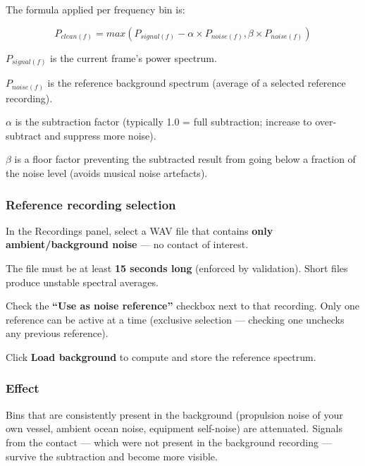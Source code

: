 The formula applied per frequency bin is:

\[
P_{clean(f)} = max( P_{signal(f)} - \alpha \times P_{noise(f)}, \beta \times P_{noise(f)} )
\]

\begin{compactitem}
\item $P_{signal(f)}$ is the current frame's power spectrum.
\item $P_{noise(f)}$ is the reference background spectrum (average of a selected reference recording).
\item $\alpha$ is the subtraction factor (typically 1.0 = full subtraction; increase to over-subtract and suppress more noise).
\item $\beta$ is a floor factor preventing the subtracted result from going below a fraction of the noise level (avoids musical noise artefacts).
\end{compactitem}

\subsubsection{Reference recording selection}
\begin{compactenum}
\item In the Recordings panel, select a WAV file that contains \textbf{only ambient/background noise} --- no contact of interest.
\item The file must be at least \textbf{15 seconds long} (enforced by validation). Short files produce unstable spectral averages.
\item Check the \textbf{``Use as noise reference''} checkbox next to that recording. Only one reference can be active at a time (exclusive selection --- checking one unchecks any previous reference).
\item Click \textbf{Load background} to compute and store the reference spectrum.
\end{compactenum}

\subsubsection{Effect}

Bins that are consistently present in the background (propulsion noise of your own vessel, ambient ocean noise, equipment self-noise) are attenuated. Signals from the contact --- which were not present in the background recording --- survive the subtraction and become more visible.


